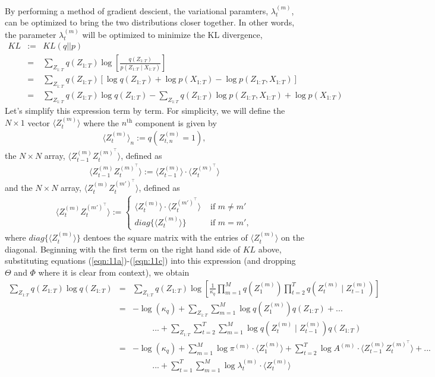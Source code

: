 \documentclass{amsart}
\begin{document}
By performing a method of gradient descient, the variational paramters,
$\lambda_t^{(m)}$, can be optimized to bring the two 
distributions closer together.  In other words, the parameter $\lambda_t^{(m)}$ 
will be optimized to minimize the KL divergence, 
\begin{eqnarray*}
KL&:=&KL(q||p)\\
 &=& \sum_{Z_{1:T}}q(Z_{1:T})\log\left[\frac{q(Z_{1:T})}{p(Z_{1:T}\mid 
X_{1:T})}\right]\\
& = & \sum_{Z_{1:T}}q(Z_{1:T})\left[\log q(Z_{1:T}) + \log p( 
X_{1:T}) - \log p(Z_{1:T},X_{1:T})\right]\\
& = & \sum_{Z_{1:T}}q(Z_{1:T})\log q(Z_{1:T}) - 
\sum_{Z_{1:T}}q(Z_{1:T})\log p(Z_{1:T},X_{1:T}) + \log p( 
X_{1:T}) 
\end{eqnarray*} 
Let's simplify this expression term by term. For simplicity, we will define the $N\times 1$ vector $\langle 
Z_t^{(m)}\rangle$ where the $n^\text{th}$ component is given by 
\begin{eqnarray*}
\langle Z_t^{(m)}\rangle_n := q(Z_{t,n}^{(m)} = 1),
\end{eqnarray*}
the $N\times N$ array, $\langle 
Z_{t-1}^{(m)}Z_t^{(m)^\intercal}\rangle$,
defined as  
\begin{eqnarray*}
\langle Z_{t-1}^{(m)}Z_t^{(m)^\intercal}\rangle :=\langle Z_{t-1}^{(m)}\rangle\cdot\langle Z_t^{(m)^\intercal}\rangle 
\end{eqnarray*}
and the $N\times N$ array, $\langle 
Z_{t}^{(m)}Z_t^{(m')^\intercal}\rangle$,
defined as
\begin{eqnarray*}
\langle Z_{t}^{(m)}Z_t^{(m')^\intercal}\rangle := \begin{cases}
\langle Z_t^{(m)}\rangle\cdot\langle Z_t^{(m')^\intercal}\rangle & \text{ 
if }m\neq m'\\
diag\{\langle Z_t^{(m)}\rangle\} & \text{ if }m=m',
\end{cases}
\end{eqnarray*}
where $diag\{\langle Z_t^{(m)}\rangle\}$ dentoes the square matrix with 
the entries of $\langle Z_t^{(m)}\rangle$ on the diagonal.
Beginning with the first term on the right hand side of $KL$ above, substituting equations 
(\ref{eqn:11a})-(\ref{eqn:11c}) into this 
expression (and dropping $\Theta$ and $\Phi$ where it is clear from 
context), we obtain 
\begin{eqnarray*}
\sum_{Z_{1:T}}q(Z_{1:T})\log q(Z_{1:T}) 
& = & \sum_{Z_{1:T}}q(Z_{1:T})\log\left[\frac{1}{\kappa_q}\prod_{m=1}^M 
q(Z_1^{(m)}) \prod_{t=2}^T q(Z_t^{(m)}\mid Z_{t-1}^{(m)})\right]\\
& = & - \log(\kappa_q)+\sum_{Z_{1:T}}\sum_{m=1}^M\log q(Z_1^{(m)})q(Z_{1:T}) + ...\\
&& \hspace{1cm}...+\sum_{Z_{1:T}}\sum_{t=2}^T\sum_{m=1}^M \log q(Z_t^{(m)}\mid Z_{t-1}^{(m)})q(Z_{1:T})
\\
& = & - \log(\kappa_q)+
\sum_{m=1}^M\log 
\pi^{(m)}\cdot \langle Z_1^{(m)}\rangle + \sum_{t=2}^T\log A^{(m)}\cdot \langle 
Z_{t-1}^{(m)}Z_t^{(m)^\intercal}\rangle+...\\
&& \hspace{1cm}...+\sum_{t=1}^T\sum_{m=1}^M\log 
\lambda_{t}^{(m)}\cdot \langle Z_{t}^{(m)}\rangle 
\end{eqnarray*}
\end{document}
